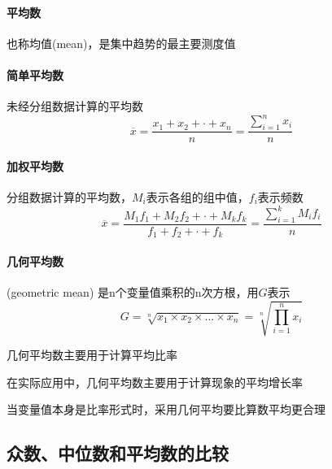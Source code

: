 \documentclass[UTF8,10pt]{book}
\begin{document}
                \paragraph{平均数} 也称均值(mean)，是集中趋势的最主要测度值
                \paragraph{简单平均数}  未经分组数据计算的平均数
                    $$ \overline{x} 
                    = \frac{x_1+x_2+\cdot+x_n}{n} 
                    = \frac{\sum_{i=1}^n x_i}{n} $$

                \paragraph{加权平均数}  分组数据计算的平均数，$M_i$表示各组的组中值，$f_i$表示频数
                    $$ \overline{x} 
                    = \frac{M_1 f_1 + M_2 f_2 + \cdot + M_k f_k}{f_1+f_2+\cdot+f_k} 
                    = \frac{\sum_{i=1}^k M_i f_i}{n} $$
                
                \paragraph{几何平均数} (geometric mean) 是n个变量值乘积的n次方根，用$G$表示
                    $$ G 
                    = \sqrt[n]{x_1 \times x_2 \times ... \times x_n} 
                    = \sqrt[n]{\prod_{i=1}^n x_i}
                    $$ 

                {\kaishu 几何平均数主要用于计算平均比率}

                {\kaishu 在实际应用中，几何平均数主要用于计算现象的平均增长率}

                {\kaishu 当变量值本身是比率形式时，采用几何平均要比算数平均更合理}

        \subsection{众数、中位数和平均数的比较}
                
\end{document}
